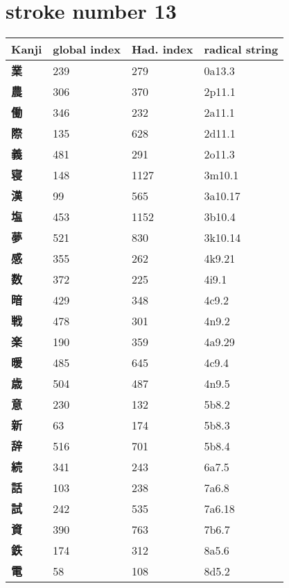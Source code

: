 \section{stroke number 13}
  \begin{longtable}[c]{llll}
    \bfseries Kanji & \bfseries global index & \bfseries Had. index & \bfseries radical string\\\hline\endhead
    \bfseries 業 & 239 & 279 & 0a13.3\\
    \bfseries 農 & 306 & 370 & 2p11.1\\
    \bfseries 働 & 346 & 232 & 2a11.1\\
    \bfseries 際 & 135 & 628 & 2d11.1\\
    \bfseries 義 & 481 & 291 & 2o11.3\\
    \bfseries 寝 & 148 & 1127 & 3m10.1\\
    \bfseries 漢 & 99 & 565 & 3a10.17\\
    \bfseries 塩 & 453 & 1152 & 3b10.4\\
    \bfseries 夢 & 521 & 830 & 3k10.14\\
    \bfseries 感 & 355 & 262 & 4k9.21\\
    \bfseries 数 & 372 & 225 & 4i9.1\\
    \bfseries 暗 & 429 & 348 & 4c9.2\\
    \bfseries 戦 & 478 & 301 & 4n9.2\\
    \bfseries 楽 & 190 & 359 & 4a9.29\\
    \bfseries 暖 & 485 & 645 & 4c9.4\\
    \bfseries 歳 & 504 & 487 & 4n9.5\\
    \bfseries 意 & 230 & 132 & 5b8.2\\
    \bfseries 新 & 63 & 174 & 5b8.3\\
    \bfseries 辞 & 516 & 701 & 5b8.4\\
    \bfseries 続 & 341 & 243 & 6a7.5\\
    \bfseries 話 & 103 & 238 & 7a6.8\\
    \bfseries 試 & 242 & 535 & 7a6.18\\
    \bfseries 資 & 390 & 763 & 7b6.7\\
    \bfseries 鉄 & 174 & 312 & 8a5.6\\
    \bfseries 電 & 58 & 108 & 8d5.2\\
  \end{longtable}
